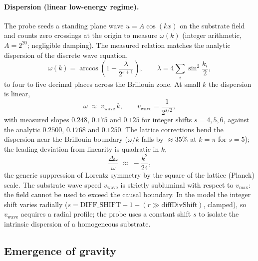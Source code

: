 \documentclass{ijuc}
\begin{document}
\paragraph{Dispersion (linear low-energy regime).}  The probe seeds a standing plane wave $u=A\cos(kx)$ on the substrate field and counts zero crossings at the origin to measure $\omega(k)$ (integer arithmetic, $A=2^{20}$; negligible damping).  The measured relation matches the analytic dispersion of the discrete wave equation,
\begin{equation}
\omega(k) = \arccos\!\left(1-\frac{\lambda}{2^{s+1}}\right), \qquad \lambda = 4\sum_{i}\sin^{2}\!\frac{k_{i}}{2},
\label{eq:dispersion}
\end{equation}
to four to five decimal places across the Brillouin zone.  At small $k$ the dispersion is linear,
\begin{equation}
\omega \;\approx\; v_{\mathrm{wave}}\,k , \qquad v_{\mathrm{wave}} = \frac{1}{2^{s/2}} ,
\label{eq:wave-speed}
\end{equation}
with measured slopes $0.248$, $0.175$ and $0.125$ for integer shifts $s=4,5,6$, against the analytic $0.2500$, $0.1768$ and $0.1250$.  The lattice corrections bend the dispersion near the Brillouin boundary ($\omega/k$ falls by $\approx35\%$ at $k=\pi$ for $s=5$); the leading deviation from linearity is quadratic in $k$,
\begin{equation}
\frac{\Delta\omega}{\omega} \;\approx\; -\frac{k^{2}}{24},
\label{eq:dispersion-correction}
\end{equation}
the generic suppression of Lorentz symmetry by the square of the lattice (Planck) scale.  The substrate wave speed $v_{\mathrm{wave}}$ is strictly subluminal with respect to $v_{\max}$: the field cannot be used to exceed the causal boundary.  In the model the integer shift varies radially ($s=\mathrm{DIFF\_SHIFT}+1-(r\gg\mathrm{diffDivShift})$, clamped), so $v_{\mathrm{wave}}$ acquires a radial profile; the probe uses a constant shift $s$ to isolate the intrinsic dispersion of a homogeneous substrate.

\subsection{Emergence of gravity}\label{subsec:emergence-of-gravity}
\end{document}
